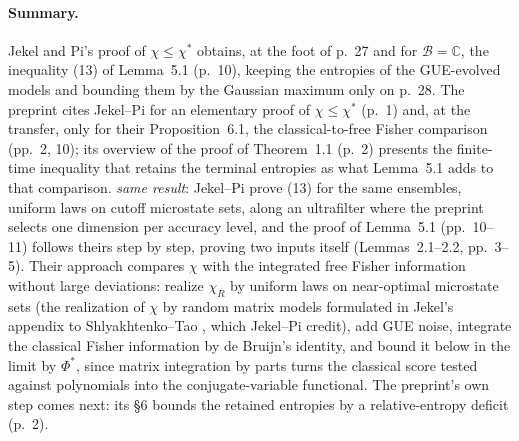 \documentclass[11pt]{article}
\newcommand{\ploc}[2]{#1}
\newcommand{\sloc}[2]{\cite[#2]{#1}}
\newcommand{\rel}[1]{\textit{#1}}
\begin{document}
\paragraph{Summary.}
Jekel and Pi's proof of $\chi\le\chi^*$
\sloc{JekelPi2023-ElementaryProofChiLeqChiStar}{proof of Thm~6.4} obtains,
at the foot of p.~27 and for $\mathcal B=\mathbb C$,
the inequality \ploc{(13)}{05-flow.tex:16--19} of
\ploc{Lemma~5.1 (p.~10)}{05-flow.tex:10--21}, keeping the entropies of the
GUE-evolved models and bounding them by the Gaussian maximum only on p.~28. The preprint cites Jekel--Pi for an elementary proof of
$\chi\le\chi^*$ \ploc{(p.~1)}{01-introduction.tex:30--32} and, at the
transfer, only for their Proposition~6.1, the classical-to-free Fisher
comparison \ploc{(pp.~2, 10)}{01-introduction.tex:95--96; 05-flow.tex:3--4};
its overview of the proof of Theorem~1.1
\ploc{(p.~2)}{01-introduction.tex:95--98} presents the finite-time inequality
that retains the terminal entropies as what Lemma~5.1 adds to that comparison.
\rel{same result}: Jekel--Pi prove (13) for the same ensembles, uniform laws
on cutoff microstate sets, along an ultrafilter where the preprint selects one
dimension per accuracy level, and the proof of Lemma~5.1
\ploc{(pp.~10--11)}{05-flow.tex:23--130} follows theirs step by step, proving
two inputs itself \ploc{(Lemmas~2.1--2.2, pp.~3--5)}{02-conventions.tex:36--177}.
Their approach compares $\chi$ with the integrated free Fisher information
without large deviations: realize $\chi_R$ by uniform laws on near-optimal
microstate sets (the realization of $\chi$ by random matrix models formulated
in Jekel's appendix to Shlyakhtenko--Tao
\sloc{ShlyakhtenkoTao2020-FractionalFreeConvolutionPowers}{Prop.~B.7}, which
Jekel--Pi credit), add GUE noise, integrate the classical Fisher information by
de Bruijn's identity, and bound it below in the limit by $\Phi^*$, since matrix
integration by parts turns the classical score tested against polynomials into
the conjugate-variable functional. The preprint's own step comes next: its
\S6 bounds the retained entropies by a relative-entropy deficit
\ploc{(p.~2)}{01-introduction.tex:99--101}.
\end{document}
